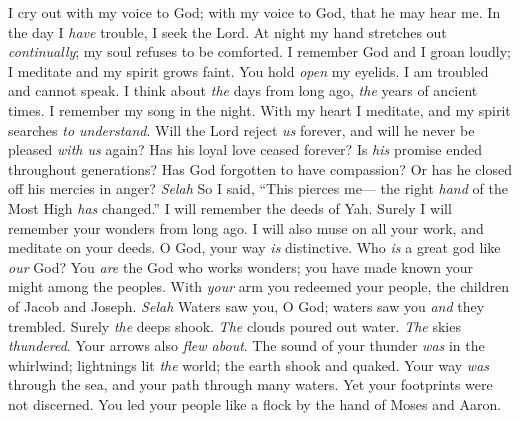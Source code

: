 \begin{biblechapter} %
 I cry out with my voice to God; 
with my voice to God, that he may hear me.
\verse In the day I \textit{have} trouble, I seek the Lord. 
At night my hand stretches out \textit{continually}; 
my soul refuses to be comforted.
\verse I remember God and I groan loudly; 
I meditate and my spirit grows faint.
\verse You hold \textit{open} my eyelids. 
I am troubled and cannot speak.
\verse I think about \textit{the} days from long ago, 
\textit{the} years of ancient times.
\verse I remember my song in the night. 
With my heart I meditate, 
and my spirit searches \textit{to understand}.
\verse Will the Lord reject \textit{us} forever, 
and will he never be pleased \textit{with us} again?
\verse Has his loyal love ceased forever? 
Is \textit{his} promise ended throughout generations?
\verse Has God forgotten to have compassion? 
Or has he closed off his mercies in anger? \textit{Selah}
\verse So I said, “This pierces me— 
the right \textit{hand} of the Most High \textit{has} changed.”
\verse I will remember the deeds of Yah. 
Surely I will remember your wonders from long ago.
\verse I will also muse on all your work, 
and meditate on your deeds.
\verse O God, your way \textit{is} distinctive. 
Who \textit{is} a great god like \textit{our} God?
\verse You \textit{are} the God who works wonders; 
you have made known your might among the peoples.
\verse With \textit{your} arm you redeemed your people, 
the children of Jacob and Joseph. \textit{Selah}
\verse Waters saw you, O God; 
waters saw you \textit{and} they trembled. 
Surely \textit{the} deeps shook.
\verse \textit{The} clouds poured out water. 
\textit{The} skies \textit{thundered}. 
Your arrows also \textit{flew about}.
\verse The sound of your thunder \textit{was} in the whirlwind; 
lightnings lit \textit{the} world; 
the earth shook and quaked.
\verse Your way \textit{was} through the sea, 
and your path through many waters. 
Yet your footprints were not discerned.
\verse You led your people like a flock 
by the hand of Moses and Aaron.
\end{biblechapter}

